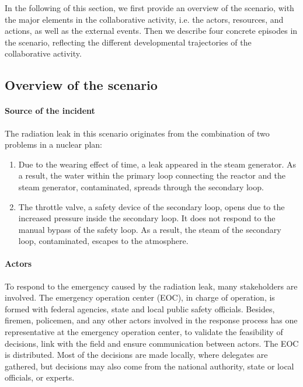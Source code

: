 In the following of this section, we first provide an overview of the scenario, with the major elements in the collaborative activity, i.e. the actors, resources, and actions, as well as the external events. Then we describe four concrete episodes in the scenario, reflecting the different developmental trajectories of the collaborative activity.

\subsection{Overview of the scenario} %
\label{sub:overview_of_the_scenario}

\paragraph*{Source of the incident} %
\label{par:source_of_the_incident}
The radiation leak in this scenario originates from the combination of two problems in a nuclear plan:
\begin{enumerate}
	\item Due to the wearing effect of time, a leak appeared in the steam generator. As a result, the water within the primary loop connecting the reactor and the steam generator, contaminated, spreads through the secondary loop.
	\item The throttle valve, a safety device of the secondary loop, opens due to the increased pressure inside the secondary loop. It does not respond to the manual bypass of the safety loop. As a result, the steam of the secondary loop, contaminated, escapes to the atmosphere.
\end{enumerate}

\paragraph*{Actors} %
\label{par:actors}
To respond to the emergency caused by the radiation leak, many stakeholders are involved. The emergency operation center (EOC), in charge of operation, is formed with federal agencies, state and local public safety officials. Besides, firemen, policemen, and any other actors involved in the response process has one representative at the emergency operation center, to validate the feasibility of decisions, link with the field and ensure communication between actors. The EOC is distributed. Most of the decisions are made locally, where delegates are gathered, but decisions may also come from the national authority, state or local officials, or experts.

